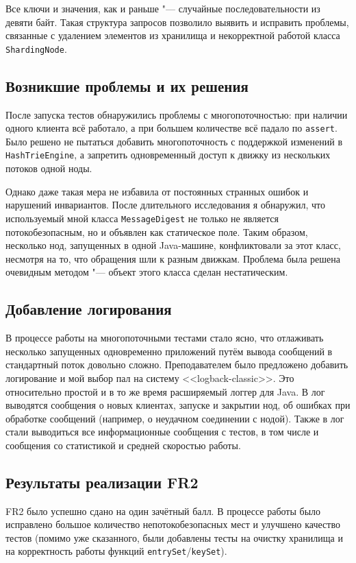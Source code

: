 \documentclass[a4paper]{article}
\renewcommand{\t}{\texttt}
\begin{document}
  Все ключи и значения, как и раньше "--- случайные последовательности из девяти байт.
  Такая структура запросов позволило выявить и исправить проблемы, связанные с удалением элементов из хранилища
  и некорректной работой класса \t{ShardingNode}.

\subsection{Возникшие проблемы и их решения}
  После запуска тестов обнаружились проблемы с многопоточностью: при наличии одного клиента всё работало,
  а при большем количестве всё падало по \t{assert}. Было решено не пытаться добавить многопоточность
  с поддержкой изменений в \t{HashTrieEngine}, а запретить одновременный доступ к движку из нескольких потоков
  одной ноды.
  
  Однако даже такая мера не избавила от постоянных странных ошибок и нарушений инвариантов. После длительного
  исследования я обнаружил, что используемый мной класса \t{MessageDigest} не только не является потокобезопасным, но и объявлен
  как статическое поле. Таким образом, несколько нод, запущенных в одной Java-машине, конфликтовали за этот
  класс, несмотря на то, что обращения шли к разным движкам. Проблема была решена очевидным
  методом "--- объект этого класса сделан нестатическим.

\subsection{Добавление логирования}
  В процессе работы на многопоточными тестами стало ясно, что отлаживать несколько запущенных одновременно
  приложений путём вывода сообщений в стандартный поток довольно сложно. Преподавателем было предложено
  добавить логирование и мой выбор пал на систему <<logback-classic>>. Это относительно простой и в то же
  время расширяемый логгер для Java. В лог выводятся сообщения о новых клиентах, запуске и закрытии нод,
  об ошибках при обработке сообщений (например, о неудачном соединении с нодой). Также в лог
  стали выводиться все информационные сообщения с тестов, в том числе и сообщения со статистикой и средней
  скоростью работы.

\subsection{Результаты реализации FR2}
  FR2 было успешно сдано на один зачётный балл. В процессе работы было исправлено большое количество
  непотокобезопасных мест и улучшено качество тестов (помимо уже сказанного, были добавлены тесты
  на очистку хранилища и на корректность работы функций \t{entrySet}/\t{keySet}).
\end{document}
